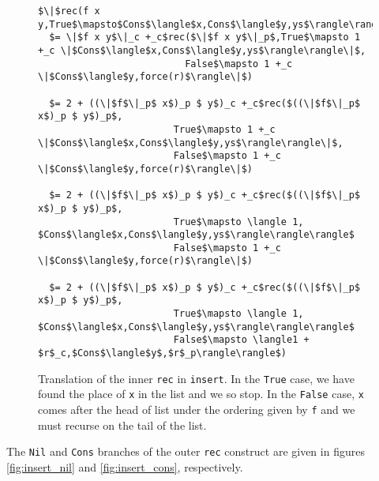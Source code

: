 \documentclass[12pt,letterpaper]{article}
\newcommand{\T}[1]{\texttt{#1}}
\begin{document}
\begin{figure}[H]
\caption{Translation of the inner \T{rec} in \T{insert}.
In the \T{True} case, we have found the place of \T{x} in the list and we so stop.
In the \T{False} case, \T{x} comes after the head of list under the ordering given by \T{f} and we must recurse on the tail of the list.
}
\label{fig:insert_inner_rec}
\begin{lstlisting}
$\|$rec(f x y,True$\mapsto$Cons$\langle$x,Cons$\langle$y,ys$\rangle\rangle$,False$\mapsto$Cons$\langle$y,force(r)$\rangle$)$\|$
  $= \|$f x y$\|_c +_c$rec($\|$f x y$\|_p$,True$\mapsto 1 +_c \|$Cons$\langle$x,Cons$\langle$y,ys$\rangle\rangle\|$,
                          False$\mapsto 1 +_c \|$Cons$\langle$y,force(r)$\rangle\|$)

  $= 2 + ((\|$f$\|_p$ x$)_p $ y$)_c +_c$rec($((\|$f$\|_p$ x$)_p $ y$)_p$,
                        True$\mapsto 1 +_c \|$Cons$\langle$x,Cons$\langle$y,ys$\rangle\rangle\|$,
                        False$\mapsto 1 +_c \|$Cons$\langle$y,force(r)$\rangle\|$)

  $= 2 + ((\|$f$\|_p$ x$)_p $ y$)_c +_c$rec($((\|$f$\|_p$ x$)_p $ y$)_p$,
                        True$\mapsto \langle 1, $Cons$\langle$x,Cons$\langle$y,ys$\rangle\rangle\rangle$
                        False$\mapsto 1 +_c \|$Cons$\langle$y,force(r)$\rangle\|$)

  $= 2 + ((\|$f$\|_p$ x$)_p $ y$)_c +_c$rec($((\|$f$\|_p$ x$)_p $ y$)_p$,
                        True$\mapsto \langle 1, $Cons$\langle$x,Cons$\langle$y,ys$\rangle\rangle\rangle$
                        False$\mapsto \langle1 + $r$_c,$Cons$\langle$y$,$r$_p\rangle\rangle$)

\end{lstlisting}
\end{figure}


The \T{Nil} and \T{Cons} branches of the outer \T{rec} construct are given in figures \ref{fig:insert_nil} and \ref{fig:insert_cons}, respectively.
\end{document}
